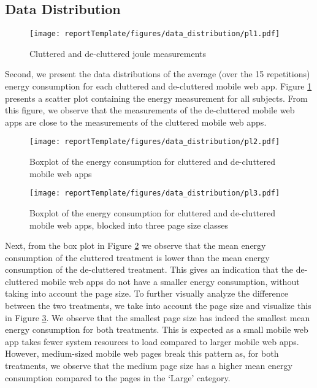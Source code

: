 \subsection{Data Distribution}

\begin{figure}[h]
\centering
\texttt{[image: reportTemplate/figures/data\_distribution/pl1.pdf]}
\caption{Cluttered and de-cluttered joule measurements} \label{fig:clutter-declutter-data-all}
\end{figure}

Second, we present the data distributions of the average (over the 15 repetitions) energy consumption for each cluttered and de-cluttered mobile web app. Figure \ref{fig:clutter-declutter-data-all} presents a scatter plot containing the energy measurement for all subjects. From this figure, we observe that the measurements of the de-cluttered mobile web apps are close to the measurements of the cluttered mobile web apps.

\begin{figure}[h]
\centering
\texttt{[image: reportTemplate/figures/data\_distribution/pl2.pdf]}
\caption{Boxplot of the energy consumption for cluttered and de-cluttered mobile web apps} \label{fig:boxplot-clutter-vs-declutter}
\end{figure}

\begin{figure}[h]
\centering
\texttt{[image: reportTemplate/figures/data\_distribution/pl3.pdf]}
\caption{Boxplot of the energy consumption for cluttered and de-cluttered mobile web apps, blocked into three page size classes} \label{fig:boxplot-clutter-vs-declutter-3-size-classes}
\end{figure}

\newpage
Next, from the box plot in Figure \ref{fig:boxplot-clutter-vs-declutter} we observe that the mean energy consumption of the cluttered treatment is lower than the mean energy consumption of the de-cluttered treatment. This gives an indication that the de-cluttered mobile web apps do not have a smaller energy consumption, without taking into account the page size. To further visually analyze the difference between the two treatments, we take into account the page size and visualize this in Figure \ref{fig:boxplot-clutter-vs-declutter-3-size-classes}. We observe that the smallest page size has indeed the smallest mean energy consumption for both treatments. This is expected as a small mobile web app takes fewer system resources to load compared to larger mobile web apps. However, medium-sized mobile web pages break this pattern as, for both treatments, we observe that the medium page size has a higher mean energy consumption compared to the pages in the `Large' category. 

